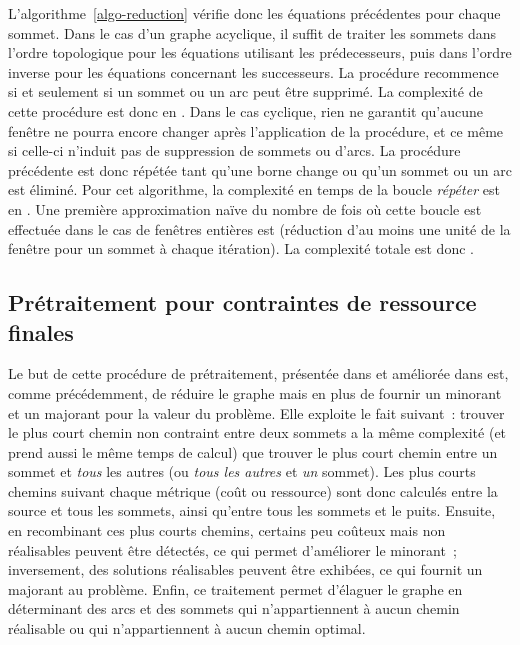 \documentclass[10pt,francais]{llncs}
\begin{document}
L'algorithme~\ref{algo-reduction} v\'erifie donc les \'equations pr\'ec\'edentes pour chaque sommet. Dans le cas d'un graphe acyclique, il suffit de traiter les sommets dans l'ordre topologique pour les \'equations utilisant les pr\'edecesseurs, puis dans l'ordre inverse pour les \'equations concernant les successeurs. La proc\'edure recommence si et seulement si un sommet ou un arc peut \^etre supprim\'e. La complexit\'e de cette proc\'edure est donc en . Dans le cas cyclique, rien ne garantit qu'aucune fen\^etre ne pourra encore changer apr\`es l'application de la proc\'edure, et ce m\^eme si celle-ci n'induit pas de suppression de sommets ou d'arcs. La proc\'edure pr\'ec\'edente est donc r\'ep\'et\'ee tant qu'une borne change ou qu'un sommet ou un arc est \'elimin\'e. Pour cet algorithme, la complexit\'e en temps de la boucle \textit{r\'ep\'eter} est en . Une premi\`ere approximation na\"ive du nombre de fois o\`u cette boucle est effectu\'ee dans le cas de fen\^etres enti\`eres est  (r\'eduction d'au moins une unit\'e de la fen\^etre pour un sommet \`a chaque it\'eration). La complexit\'e totale est donc .


\subsection{Pr\'etraitement pour contraintes de ressource finales}\label{sub-reduc-final}
Le but de cette proc\'edure de pr\'etraitement, pr\'esent\'ee dans \cite{Aneja1983} et am\'elior\'ee dans\cite{Dumitrescu2003} est, comme pr\'ec\'edemment, de r\'eduire le graphe mais en plus de fournir un minorant et un majorant pour la valeur du probl\`eme. Elle exploite le fait suivant~: trouver le plus court chemin non contraint entre deux sommets a la m\^eme complexit\'e (et prend aussi le m\^eme temps de calcul) que trouver le plus court chemin entre un sommet et {\em tous} les autres (ou {\em tous les autres} et {\em un} sommet). Les plus courts chemins suivant chaque m\'etrique (co\^ut ou ressource) sont donc calcul\'es entre la source et tous les sommets, ainsi qu'entre tous les sommets et le puits. Ensuite, en recombinant ces plus courts chemins, certains peu co\^uteux mais non r\'ealisables peuvent \^etre d\'etect\'es, ce qui permet d'am\'eliorer le minorant~; inversement,  des solutions r\'ealisables peuvent \^etre exhib\'ees, ce qui fournit un majorant au probl\`eme. Enfin, ce traitement permet d'\'elaguer le graphe en d\'eterminant des arcs et des sommets qui n'appartiennent \`a aucun chemin r\'ealisable ou qui n'appartiennent \`a aucun chemin optimal.\\
\end{document}
